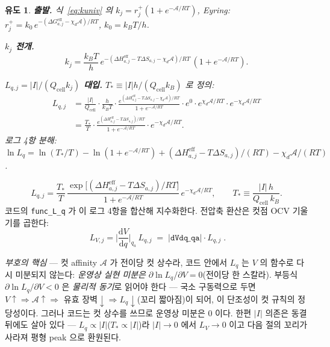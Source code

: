 \documentclass[11pt,a4paper]{article}
\newtheorem*{derivebox}{유도}
\newcommand{\dd}{\mathrm{d}}
\newcommand{\eff}{\mathrm{eff}}
\newcommand{\cell}{\mathrm{cell}}
\newcommand{\code}[1]{\texttt{#1}}
\begin{document}
\begin{derivebox}
\textbf{출발.} 식~\eqref{eq:kuniv} 의 $k_j=r_j^+(1+e^{-\mathcal A/RT})$, Eyring: $r_j^+=k_0\,e^{-(\Delta G_{a,j}^\eff-\chi_d\mathcal A)/RT}$,
$k_0=k_BT/h$.

\textbf{$k_j$ 전개.}
\begin{equation*}
k_j=\frac{k_BT}{h}\,e^{-(\Delta H_{a,j}^\eff-T\Delta S_{a,j}-\chi_d\mathcal A)/RT}\,(1+e^{-\mathcal A/RT}).
\end{equation*}

\textbf{$L_{q,j}=|I|/(Q_\cell k_j)$ 대입.} $T_*\equiv|I|h/(Q_\cell k_B)$ 로 정의:
\begin{align*}
L_{q,j}&=\frac{|I|}{Q_\cell}\cdot\frac{h}{k_BT}\cdot
\frac{e^{(\Delta H_{a,j}^\eff-T\Delta S_{a,j}-\chi_d\mathcal A)/RT}}{1+e^{-\mathcal A/RT}}
\cdot e^{0}\cdot e^{\chi_d\mathcal A/RT}\cdot e^{-\chi_d\mathcal A/RT}\\
&=\frac{T_*}{T}\cdot
\frac{e^{(\Delta H_{a,j}^\eff-T\Delta S_{a,j})/RT}}{1+e^{-\mathcal A/RT}}
\cdot e^{-\chi_d\mathcal A/RT}.
\end{align*}
로그 4항 분해:
$\ln L_q=\ln(T_*/T)-\ln(1+e^{-\mathcal A/RT})+(\Delta H_{a,j}^\eff-T\Delta S_{a,j})/(RT)-\chi_d\mathcal A/(RT)$.
\end{derivebox}
\begin{equation}
L_{q,j}=\frac{T_*}{T}\,\frac{\exp\!\big[(\Delta H_{a,j}^\eff-T\Delta S_{a,j})/RT\big]}{1+e^{-\mathcal A/RT}}
\,e^{-\chi_d\mathcal A/RT},
\qquad T_*\equiv\frac{|I|\,h}{Q_\cell\,k_B}.
\label{eq:Lqfull}
\end{equation}
코드의 \code{func\_L\_q} 가 이 로그 4항을 합산해 지수화한다. 전압축 환산은 컷점 OCV 기울기를 곱한다:
\begin{equation}
\boxed{\;L_{V,j}=\Big|\frac{\dd V}{\dd q}\Big|_{q_a}\,L_{q,j}\;=\;|\code{dVdq\_qa}|\cdot L_{q,j}\;.}
\label{eq:LV}
\end{equation}

\emph{부호의 핵심} — 컷 affinity $\mathcal A$ 가 전이당 컷 상수라, 코드 안에서 $L_q$ 는 $V$ 의 함수로 다시 미분되지
않는다: \emph{운영상 실현 미분은} $\partial\ln L_q/\partial V=0$(전이당 한 스칼라). 부등식 $\partial\ln L_q/\partial V<0$ 은
\emph{물리적 동기}로 읽어야 한다 — 국소 구동력으로 두면 $V\!\uparrow\Rightarrow\mathcal A\!\uparrow\Rightarrow$
유효 장벽$\downarrow\Rightarrow L_q\downarrow$(꼬리 짧아짐)이 되어, 이 단조성이 컷 규칙의 정당성이다. 그러나 코드는
컷 상수를 쓰므로 운영상 미분은 $0$ 이다. 한편 $|I|$ 의존은 동결 뒤에도 살아 있다 — $L_q\propto|I|$($T_*\propto|I|$)라
$|I|\to0$ 에서 $L_V\to0$ 이고 다음 절의 꼬리가 사라져 평형 peak 으로 환원된다.
\end{document}
